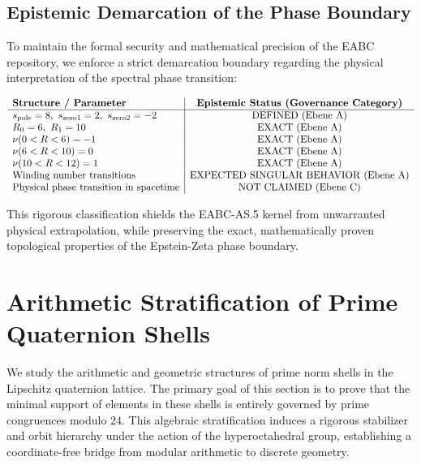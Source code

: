 \documentclass[11pt,a4paper]{article}
\theoremstyle{definition}
\begin{document}
	\subsection{Epistemic Demarcation of the Phase Boundary}
	To maintain the formal security and mathematical precision of the EABC repository, we enforce a strict demarcation boundary regarding the physical interpretation of the spectral phase transition:
	
	\begin{equation}
		\begin{array}{l|c}
			\textbf{Structure / Parameter} & \textbf{Epistemic Status (Governance Category)} \\
			\hline
			s_{\rm pole}=8,\ s_{\rm zero1}=2,\ s_{\rm zero2}=-2 & \mathrm{DEFINED\ (Ebene\ A)} \\
			R_0=6,\ R_1=10 & \mathrm{EXACT\ (Ebene\ A)} \\
			\nu(0 < R < 6)=-1 & \mathrm{EXACT\ (Ebene\ A)} \\
			\nu(6 < R < 10)=0 & \mathrm{EXACT\ (Ebene\ A)} \\
			\nu(10 < R < 12)=1 & \mathrm{EXACT\ (Ebene\ A)} \\
			\text{Winding number transitions} & \mathrm{EXPECTED\ SINGULAR\ BEHAVIOR\ (Ebene\ A)} \\
			\text{Physical phase transition in spacetime} & \mathrm{NOT\ CLAIMED\ (Ebene\ C)} \\
		\end{array}
	\end{equation}
	
	This rigorous classification shields the EABC-AS.5 kernel from unwarranted physical extrapolation, while preserving the exact, mathematically proven topological properties of the Epstein-Zeta phase boundary.
	
	
	\section{Arithmetic Stratification of Prime Quaternion Shells}
	\label{sec:prime_shell_stratification}
	
	We study the arithmetic and geometric structures of prime norm shells in the Lipschitz quaternion lattice. The primary goal of this section is to prove that the minimal support of elements in these shells is entirely governed by prime congruences modulo $24$. This algebraic stratification induces a rigorous stabilizer and orbit hierarchy under the action of the hyperoctahedral group, establishing a coordinate-free bridge from modular arithmetic to discrete geometry.
	
\end{document}
